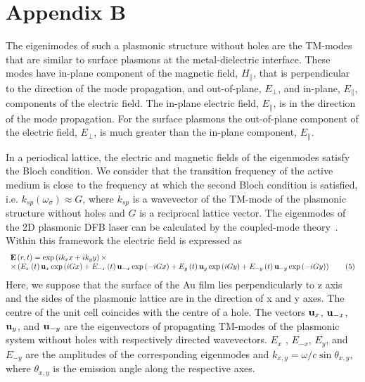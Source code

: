 \documentclass[aps,pra,amsmath,amssymb,onecolumn,superscriptaddress,showpacs,floatfix,]{revtex4-1}
\begin{document}
\section*{Appendix B}
The eigenimodes of such a plasmonic structure without holes are the TM-modes that are similar to surface plasmons at the metal-dielectric interface.
These modes have in-plane component of the magnetic field, $H_{\parallel}$, that is perpendicular to the direction of the mode propagation, and out-of-plane, $E_{\perp}$, and in-plane, $E_{\parallel}$, components of the electric field.
The in-plane electric field, $E_{\parallel}$, is in the direction of the mode propagation.
For the surface plasmons the out-of-plane component of the electric field, $E_{\perp}$, is much greater than the in-plane component, $E_{\parallel}$.

In a periodical lattice, the electric and magnetic fields of the eigenmodes satisfy the Bloch condition. 
We consider that the transition frequency of the active medium is close to the frequency at which the second Bloch condition is satisfied, i.e. $k_{sp}(\omega_{\sigma}) \approx G$, where $k_{sp}$ is a wavevector of the TM-mode of the plasmonic structure without holes and $G$ is a reciprocal lattice vector. 
The eigenmodes of the 2D plasmonic DFB laser can be calculated by the coupled-mode theory~\cite{ExterOptExp,TennerJOpt}. 
Within this framework the electric field is expressed as
\begin{equation}
\begin{array}{l}
{\bf{E}}\left( {r,t} \right) = \exp \left( {i{k_x}x + i{k_y}y} \right) \times \\
\times \left( {{E_x}\left( t \right){{\bf{u}}_x}\exp \left( {iGx} \right) + {E_{ - x}}\left( t \right){{\bf{u}}_{ - x}}\exp \left( { - iGx} \right) + {E_y}\left( t \right){{\bf{u}}_y}\exp \left( {iGy} \right) + {E_{ - y}}\left( t \right){{\bf{u}}_{ - y}}\exp \left( { - iGy} \right)} \right)\tag{5}
\end{array}
\end{equation}
Here, we suppose that the surface of the Au film lies perpendicularly to z axis and the sides of the plasmonic lattice are in the direction of x and y axes. 
The centre of the unit cell coincides with the centre of a hole.
The vectors ${{\bf{u}}_x}$,  ${{\bf{u}}_{ - x}}$, ${{\bf{u}}_y}$, and ${{\bf{u}}_{ - y}}$  are the eigenvectors of propagating TM-modes of the plasmonic system without holes with respectively directed wavevectors.
${E_x}$ , ${E_{ - x}}$,  ${E_y}$, and ${E_{ - y}}$  are the amplitudes of the corresponding eigenmodes and ${k_{x,y}} = \omega /c\sin {\theta _{x,y}}$, where ${\theta _{x,y}}$ is the emission angle along the respective axes.
\end{document}
